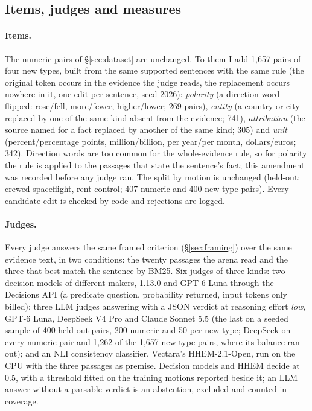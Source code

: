 \subsection{Items, judges and measures}

\paragraph{Items.} The \nPairs{} numeric pairs of \S\ref{sec:dataset} are unchanged. To them I add 1,657 pairs of four new types, built from the same supported sentences with the same rule (the original token occurs in the evidence the judge reads, the replacement occurs nowhere in it, one edit per sentence, seed 2026): \emph{polarity} (a direction word flipped: rose/fell, more/fewer, higher/lower; 269 pairs), \emph{entity} (a country or city replaced by one of the same kind absent from the evidence; 741), \emph{attribution} (the source named for a fact replaced by another of the same kind; 305) and \emph{unit} (percent/percentage points, million/billion, per year/per month, dollars/euros; 342). Direction words are too common for the whole-evidence rule, so for polarity the rule is applied to the passages that state the sentence's fact; this amendment was recorded before any judge ran. The split by motion is unchanged (held-out: crewed spaceflight, rent control; 407 numeric and 400 new-type pairs). Every candidate edit is checked by code and rejections are logged.

\paragraph{Judges.} Every judge answers the same framed criterion (\S\ref{sec:framing}) over the same evidence text, in two conditions: the twenty passages the arena read and the three that best match the sentence by BM25. Six judges of three kinds: two decision models of different makers, \jev{} 1.13.0 and GPT-6 Luna through the Decisions API (a predicate question, probability returned, input tokens only billed); three LLM judges answering with a JSON verdict at reasoning effort \emph{low}, GPT-6 Luna, DeepSeek V4 Pro and Claude Sonnet 5.5 (the last on a seeded sample of 400 held-out pairs, 200 numeric and 50 per new type; DeepSeek on every numeric pair and 1,262 of the 1,657 new-type pairs, where its balance ran out); and an NLI consistency classifier, Vectara's HHEM-2.1-Open, run on the CPU with the three passages as premise. Decision models and HHEM decide at 0.5, with a threshold fitted on the training motions reported beside it; an LLM answer without a parsable verdict is an abstention, excluded and counted in coverage.

